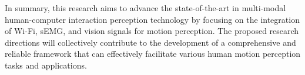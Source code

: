 \documentclass[12pt, a4paper]{article}
\begin{document}
In summary, this research aims to advance the state-of-the-art in multi-modal human-computer interaction perception technology by focusing on the integration of Wi-Fi, sEMG, and vision signals for motion perception. The proposed research directions will collectively contribute to the development of a comprehensive and reliable framework that can effectively facilitate various human motion perception tasks and applications.

\end{document}
